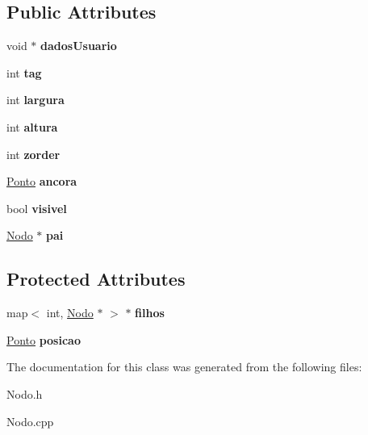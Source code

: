 \subsection*{Public Attributes}
\begin{DoxyCompactItemize}
\item 
\hypertarget{class_edda_1_1_nodo_ab64da13c954f000cefddc7f61b02ce33}{
void $\ast$ {\bfseries dadosUsuario}}
\label{class_edda_1_1_nodo_ab64da13c954f000cefddc7f61b02ce33}

\item 
\hypertarget{class_edda_1_1_nodo_ab459829e56c07d11526bc1d1033f1576}{
int {\bfseries tag}}
\label{class_edda_1_1_nodo_ab459829e56c07d11526bc1d1033f1576}

\item 
\hypertarget{class_edda_1_1_nodo_a89d63b77493f24ad5e1aeb5e3d7f2cd0}{
int {\bfseries largura}}
\label{class_edda_1_1_nodo_a89d63b77493f24ad5e1aeb5e3d7f2cd0}

\item 
\hypertarget{class_edda_1_1_nodo_a22743b8f0b5b30513c7711dd5b431a1e}{
int {\bfseries altura}}
\label{class_edda_1_1_nodo_a22743b8f0b5b30513c7711dd5b431a1e}

\item 
\hypertarget{class_edda_1_1_nodo_a7e69594520d66e138146770a108c3032}{
int {\bfseries zorder}}
\label{class_edda_1_1_nodo_a7e69594520d66e138146770a108c3032}

\item 
\hypertarget{class_edda_1_1_nodo_a3da68b47212b6da1bca4c53f54fd9cf1}{
\hyperlink{class_edda_1_1_ponto}{Ponto} {\bfseries ancora}}
\label{class_edda_1_1_nodo_a3da68b47212b6da1bca4c53f54fd9cf1}

\item 
\hypertarget{class_edda_1_1_nodo_aef9595a170e42da4c7332ba2ae46c313}{
bool {\bfseries visivel}}
\label{class_edda_1_1_nodo_aef9595a170e42da4c7332ba2ae46c313}

\item 
\hypertarget{class_edda_1_1_nodo_a46be1d9acc858dba92a238c62b1d589e}{
\hyperlink{class_edda_1_1_nodo}{Nodo} $\ast$ {\bfseries pai}}
\label{class_edda_1_1_nodo_a46be1d9acc858dba92a238c62b1d589e}

\end{DoxyCompactItemize}
\subsection*{Protected Attributes}
\begin{DoxyCompactItemize}
\item 
\hypertarget{class_edda_1_1_nodo_a051ce3dea1c5e7599534824f4dfc2102}{
map$<$ int, \hyperlink{class_edda_1_1_nodo}{Nodo} $\ast$ $>$ $\ast$ {\bfseries filhos}}
\label{class_edda_1_1_nodo_a051ce3dea1c5e7599534824f4dfc2102}

\item 
\hypertarget{class_edda_1_1_nodo_ac95e8bf6a963a5f265dd62a6cb9b4bc0}{
\hyperlink{class_edda_1_1_ponto}{Ponto} {\bfseries posicao}}
\label{class_edda_1_1_nodo_ac95e8bf6a963a5f265dd62a6cb9b4bc0}

\end{DoxyCompactItemize}


The documentation for this class was generated from the following files:\begin{DoxyCompactItemize}
\item 
Nodo.h\item 
Nodo.cpp\end{DoxyCompactItemize}
